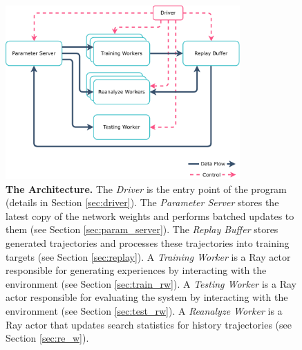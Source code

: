 \begin{figure}[htbp]
    \captionsetup{width=\textwidth}
    \centering
    \includegraphics[width=0.8\textwidth, height=0.8\textheight,keepaspectratio]{assets/moozi_architecture.pdf}
    \caption[\textbf{The \moozi Architecture.}]{
        \textbf{The \moozi Architecture.}
        The \textit{Driver} is the entry point of the program (details in Section \ref{sec:driver}).
        The \textit{Parameter Server} stores the latest copy of the network weights and performs batched updates to them (see Section \ref{sec:param_server}).
        The \textit{Replay Buffer} stores generated trajectories and processes these trajectories into training targets (see Section \ref{sec:replay}).
        A \textit{Training Worker} is a Ray actor responsible for generating experiences by interacting with the environment (see Section \ref{sec:train_rw}).
        A \textit{Testing Worker} is a Ray actor responsible for evaluating the system by interacting with the environment (see Section \ref{sec:test_rw}).
        A \textit{Reanalyze Worker} is a Ray actor that updates search statistics for history trajectories (see Section \ref{sec:re_w}).
    }
    \label{fig:moozi_architecture}
\end{figure}


